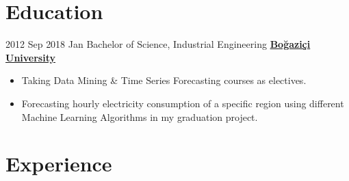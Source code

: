 \documentclass[letterpaper]{DS_class_file} %
\begin{document}
\makeprofile %


\section{Education}

\begin{twenty} %
   	\twentyitem
	    {2012 Sep}
	    {2018 Jan}
	    {\hspace{0.2cm}Bachelor of Science, Industrial Engineering}
	    {\href{http://www.ie.boun.edu.tr/}{\hspace{0.27cm} \textbf{Boğaziçi University} }}
	    {}
	    {\begin{itemize}
			\item Taking Data Mining \& Time Series Forecasting courses as electives.
			\item Forecasting hourly electricity consumption of a specific region using different Machine Learning Algorithms in my graduation project.

		\end{itemize}} 
\end{twenty}


\section{Experience}
\end{document}
